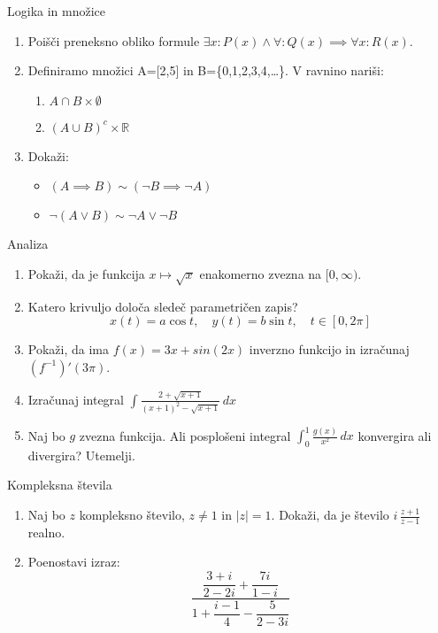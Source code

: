 \begin{frame}{Logika in množice}
	\begin{enumerate}
		\item
		Poišči preneksno obliko formule \(\exists x: P(x) \land \forall: Q(x) \implies \forall x: R(x).\)
		\item 
		Definiramo množici A=[2,5] in B=\{0,1,2,3,4,\ldots\}.
		V ravnino nariši:
		\begin{enumerate}
		   \item \( A \cap B \times \emptyset \)
		   \item \( (A \cup B)^c \times \mathbb{R} \)
		\end{enumerate}
		\item
		Dokaži:
		\begin{itemize}
			\item \( (A \implies B) \sim (\neg B \implies \neg A) \)
			\item \( \neg(A \lor B) \sim \neg A \lor \neg B \)
		\end{itemize}
	\end{enumerate}
\end{frame}

\begin{frame}{Analiza}
	\begin{enumerate}
		\item
		Pokaži, da je funkcija \( x \mapsto \sqrt{x} \) enakomerno zvezna na \([0,\infty).\)
		\item 
		Katero krivuljo določa sledeč parametričen zapis?
		$$
		   x(t) = a \cos t, \quad %
		   y(t) = b \sin t, \quad %
		   t \in [0, 2 \pi]
		$$ 
		\item
		Pokaži, da ima \( f(x) = 3x + sin(2x) \) inverzno funkcijo in izračunaj \( (f^{-1})'(3\pi) \).
		
		\item
		Izračunaj integral 
		\(\displaystyle \int \frac{2+\sqrt{x+1}}{(x+1)^2-\sqrt{x+1}} \, dx \)
		
		\item 
		Naj bo $g$ zvezna funkcija. Ali posplošeni integral 
		\(\displaystyle \int_0^1 \frac{g(x)}{x^2} \, dx \)
		konvergira ali divergira? Utemelji.
	\end{enumerate}
\end{frame}

\begin{frame}{Kompleksna števila}
	\begin{enumerate}
		\item
		Naj bo $z$ kompleksno število, $z \ne 1$ in \( \left|z\right| = 1\).
		Dokaži, da je število \( i \, \frac{z+1}{z-1} \) realno.
		\item
		Poenostavi izraz:
		\[ \frac{\dfrac{3 + i}{2-2i} + \dfrac{7i}{1-i}}{1+ \dfrac{i-1}{4} - \dfrac{5}{2-3i}}\]
	\end{enumerate}
\end{frame}